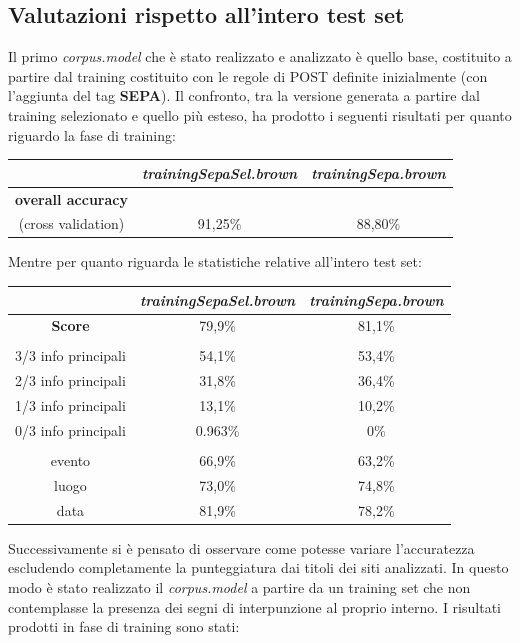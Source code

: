 \documentclass[a4paper]{report}
\begin{document}
\subsection{Valutazioni rispetto all'intero test set}
Il primo \textit{corpus.model} che è stato realizzato e analizzato è quello base, costituito a partire dal training costituito con le regole di POST definite inizialmente (con l'aggiunta del tag \textbf{SEPA}). Il confronto, tra la versione generata a partire dal training selezionato e quello più esteso, ha prodotto i seguenti risultati per quanto riguardo la fase di training:
\begin{center}
\begin{tabular}{c c c}
\hline
 & \textit{trainingSepaSel.brown} & \textit{trainingSepa.brown}\\
\hline
\textbf{overall accuracy} \\ (cross validation) & 91,25\% & 88,80\% \\
\hline
\end{tabular}
\end{center}
Mentre per quanto riguarda le statistiche relative all'intero test set:
\begin{center}
\begin{tabular}{|ccc|}
\hline
 & \textit{trainingSepaSel.brown} & \textit{trainingSepa.brown}\\
\hline
\textbf{Score} & 79,9\% & 81,1\% \\
\hline
 & &  \\
\hline
3/3 info principali & 54,1\% & 53,4\% \\
2/3 info principali & 31,8\% & 36,4\% \\
1/3 info principali & 13,1\% & 10,2\% \\
0/3 info principali & 0.963\% & 0\% \\
\hline
 & &  \\
\hline
evento & 66,9\% & 63,2\% \\
luogo & 73,0\% & 74,8\% \\
data & 81,9\% & 78,2\% \\
\hline
\end{tabular}
\end{center}
Successivamente si è pensato di osservare come potesse variare l'accuratezza escludendo completamente la punteggiatura dai titoli dei siti analizzati. In questo modo è stato realizzato il \textit{corpus.model} a partire da un training set che non contemplasse la presenza dei segni di interpunzione al proprio interno. I risultati prodotti in fase di training sono stati:
\end{document}
